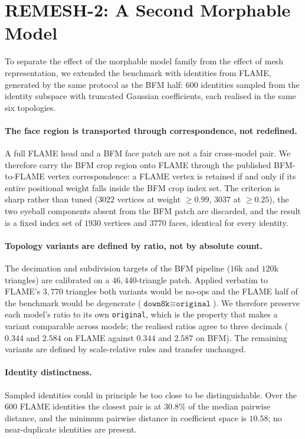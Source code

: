 \documentclass{article}
\begin{document}
\section{REMESH-2: A Second Morphable Model}
\label{sec:supp_remesh2}

To separate the effect of the morphable model family from the effect of mesh
representation, we extended the benchmark with identities from FLAME, generated by the
same protocol as the BFM half: $600$ identities sampled from the identity subspace with
truncated Gaussian coefficients, each realised in the same six topologies.

\paragraph{The face region is transported through correspondence, not redefined.}
A full FLAME head and a BFM face patch are not a fair cross-model pair. We therefore
carry the BFM crop region onto FLAME through the published BFM-to-FLAME vertex
correspondence: a FLAME vertex is retained if and only if its entire positional weight
falls inside the BFM crop index set. The criterion is sharp rather than tuned ($3022$
vertices at weight $\ge 0.99$, $3037$ at $\ge 0.25$), the two eyeball components absent
from the BFM patch are discarded, and the result is a fixed index set of $1930$ vertices
and $3770$ faces, identical for every identity.

\paragraph{Topology variants are defined by ratio, not by absolute count.}
The decimation and subdivision targets of the BFM pipeline ($16$k and $120$k triangles)
are calibrated on a $46{,}440$-triangle patch. Applied verbatim to FLAME's $3{,}770$
triangles both variants would be no-ops and the FLAME half of the benchmark would be
degenerate ($\texttt{down8k} \equiv \texttt{original}$). We therefore preserve each
model's ratio to its own \texttt{original}, which is the property that makes a variant
comparable across models; the realised ratios agree to three decimals
($0.344$ and $2.584$ on FLAME against $0.344$ and $2.587$ on BFM). The remaining
variants are defined by scale-relative rules and transfer unchanged.

\paragraph{Identity distinctness.}
Sampled identities could in principle be too close to be distinguishable. Over the $600$
FLAME identities the closest pair is at $30.8\%$ of the median pairwise distance, and the
minimum pairwise distance in coefficient space is $10.58$; no near-duplicate identities
are present.
\end{document}
